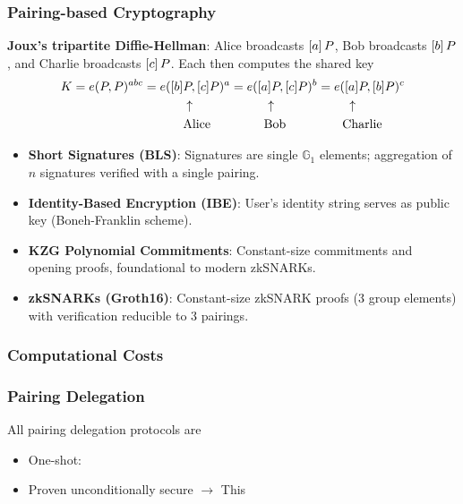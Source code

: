 \documentclass{beamer}
\begin{document}
\begin{frame}
    \frametitle{Pairing-based Cryptography}
    
\pause
    \small
\textbf{Joux's tripartite Diffie-Hellman}:
        Alice broadcasts $\left[a\right]P$, Bob broadcasts $\left[b\right]P$, and Charlie broadcasts $\left[c\right]P$. Each then computes the shared key
\begin{align*}
K = e(P, P)^{abc} =e([b]&P,[c]P)^a=e([a]P, [c]P)^b=e([a]P, [b]P)^c  
\\
&\uparrow\hspace{6em}\uparrow\hspace{6em}\uparrow
\\
&\text{Alice}\hspace{4.25em}\text{Bob}\hspace{4.5em}\text{Charlie}
\end{align*}
\pause
\vspace{-1em}
    \begin{itemize}
  \item \textbf{Short Signatures (BLS)}: Signatures are single $\mathbb{G}_1$
    elements; aggregation of $n$ signatures verified with a single pairing.
\pause
  \item \textbf{Identity-Based Encryption (IBE)}: User's identity string serves
    as public key (Boneh-Franklin scheme).
\pause
  \item \textbf{KZG Polynomial Commitments}: Constant-size commitments and
    opening proofs, foundational to modern zkSNARKs.
\pause
  \item \textbf{zkSNARKs (Groth16)}: Constant-size zkSNARK proofs (3 group elements) with verification reducible to 3 pairings.
    \end{itemize}
\end{frame}

\begin{frame}
    \frametitle{Computational Costs}
    
\end{frame}

\begin{frame}
    \frametitle{Pairing Delegation}
    All pairing delegation protocols are 
    \begin{itemize}
        \item One-shot: 
        \item Proven unconditionally secure $\rightarrow$ This 
    \end{itemize}
\end{frame}
\end{document}
